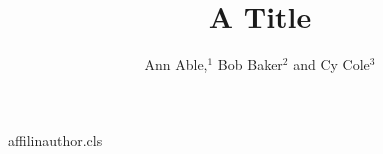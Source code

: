\begin{filecontents*}[overwrite]{affilinauthor.cls}
\def\YES{yes}
\def\chk@key{no}
\def\affilfont{\small\leftskip2em\rightskip0pt plus1fil}
\def\affil#1{\par\ifx\chk@key\YES\else\vskip6\p@\fi{\reset@font\affilfont#1\par}\def\chk@key{yes}}
\def\@maketitle{\newpage{\Large\bfseries\@title\par}\vskip1em\noindent{\bfseries\@author\par}\vskip1em}
\end{filecontents*}
\documentclass{affilinauthor}

\title{A Title}
\author{Ann Able,$^1$ Bob Baker$^2$ and Cy Cole$^3$
}
\maketitle
Body.

